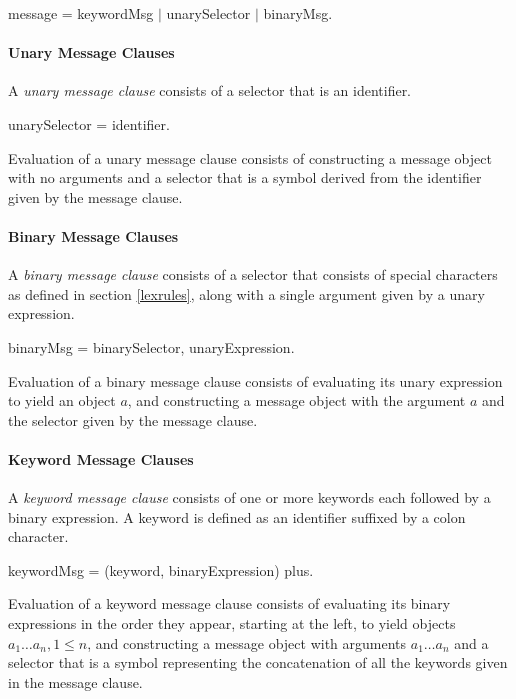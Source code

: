\documentclass{article}
\begin{document}
\begin{newspeak}
message = keywordMsg $|$ unarySelector $|$ binaryMsg.
\end{newspeak}

\paragraph{Unary Message Clauses}
\label{unaryMsg}

A {\em unary message clause} consists of a selector that is an identifier.
\begin{newspeak}
unarySelector = identifier.
\end{newspeak}
Evaluation of a unary message clause consists of constructing a message object with no arguments and a selector that is a symbol derived from the identifier given by the message clause.

\paragraph{Binary Message Clauses}
\label{binaryMsg}

A {\em binary message clause} consists of a selector that consists of special characters as defined in section \ref{lexrules}, along with a single argument given by a unary expression.

\begin{newspeak}
binaryMsg = binarySelector, unaryExpression.
\end{newspeak}
Evaluation of a binary message clause consists of evaluating its unary expression to yield an object $a$, and constructing a message object with the argument $a$ and the selector given by the message clause.

\paragraph{Keyword Message Clauses}
\label{keywordMsg}

A {\em keyword message clause} consists of one or more keywords each followed by a binary expression. A keyword is defined as an identifier suffixed by a colon character.
\begin{newspeak}
 keywordMsg =  (keyword, binaryExpression) plus.
\end{newspeak}
Evaluation of a keyword message clause consists of evaluating its binary expressions in the order they appear, starting at the left,  to yield objects $a_1 \ldots a_n, 1 \le n$, and constructing a message object with  arguments $a_1 \ldots a_n$ and a selector that is a symbol representing the concatenation of all the keywords given in the message clause.
\end{document}
